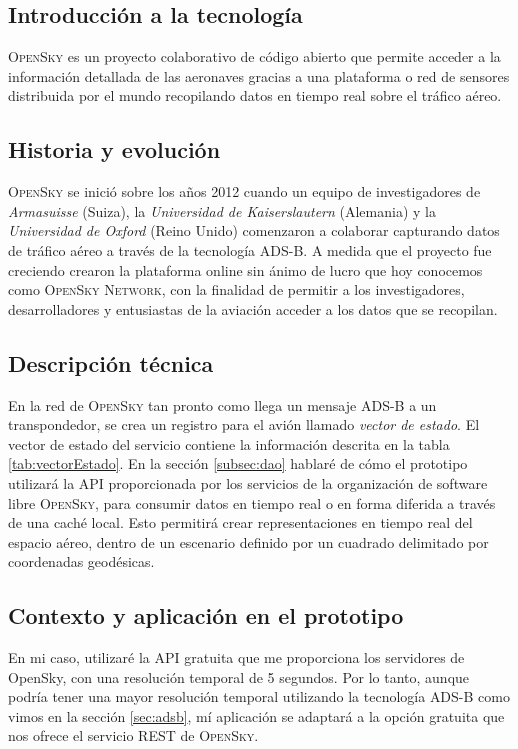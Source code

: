 \documentclass[a4paper, 11pt]{book}
\begin{document}
\subsection{Introducción a la tecnología}
\textsc{OpenSky} es un proyecto colaborativo de código abierto que permite acceder a la información detallada de las aeronaves gracias a una plataforma o red de sensores distribuida por el mundo recopilando datos en tiempo real sobre el tráfico aéreo.
\subsection{Historia y evolución}
\textsc{OpenSky} se inició sobre los años 2012 cuando un equipo de investigadores de \emph{Armasuisse} (Suiza), la \emph{Universidad de Kaiserslautern} (Alemania) y la \emph{Universidad de Oxford} (Reino Unido) comenzaron a colaborar capturando datos de tráfico aéreo a través de la tecnología \textsc{ADS-B}.
A medida que el proyecto fue creciendo crearon la plataforma online sin ánimo de lucro que hoy conocemos como \textsc{OpenSky Network}, con la finalidad de permitir a los investigadores, desarrolladores y entusiastas de la aviación acceder a los datos que se recopilan.
\subsection{Descripción técnica}
En la red de \textsc{OpenSky} tan pronto como llega un mensaje \textsc{ADS-B} a un transpondedor, se crea un registro para el avión llamado \emph{vector de estado}.
El vector de estado del servicio contiene la información descrita en la tabla \ref{tab:vectorEstado}.
En la sección \ref{subsec:dao} hablaré de cómo el prototipo utilizará la \textsc{\gls{API}} proporcionada por los servicios de la organización de software libre \textsc{OpenSky}, para consumir datos en tiempo real o en forma diferida a través de una caché local. Esto permitirá crear representaciones en tiempo real del espacio aéreo, dentro de un escenario definido por un cuadrado delimitado por coordenadas geodésicas.

\subsection{Contexto y aplicación en el prototipo}
En mi caso, utilizaré la \textsc{API} gratuita que me proporciona los servidores de OpenSky, con una resolución temporal de 5 segundos. Por lo tanto, aunque podría tener una mayor resolución temporal utilizando la tecnología \textsc{ADS-B} como vimos en la sección \ref{sec:adsb}, mí aplicación se adaptará a la opción gratuita que nos ofrece el servicio \textsc{REST} de \textsc{OpenSky}.
\end{document}
